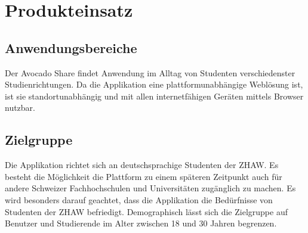\section{Produkteinsatz}
\subsection{Anwendungsbereiche}
Der Avocado Share findet Anwendung im Alltag von Studenten verschiedenster Studienrichtungen. Da die Applikation eine plattformunabhängige Weblösung ist, ist sie standortunabhängig und mit allen internetfähigen Geräten mittels Browser nutzbar. 

\subsection{Zielgruppe}
Die Applikation richtet sich an deutschsprachige Studenten der ZHAW. Es besteht die Möglichkeit die Plattform zu einem späteren Zeitpunkt auch für andere Schweizer Fachhochschulen und Universitäten zugänglich zu machen. Es wird besonders darauf geachtet, dass die Applikation die Bedürfnisse von Studenten der ZHAW befriedigt. Demographisch lässt sich die Zielgruppe auf Benutzer und Studierende im Alter zwischen 18 und 30 Jahren begrenzen.